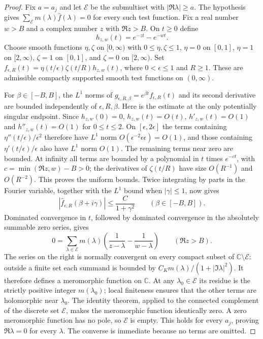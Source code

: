 \documentclass[11pt,a4paper]{article}
\theoremstyle{definition}\newtheorem{definition}[theorem]{Definition}
\theoremstyle{remark}\newtheorem{remark}[theorem]{Remark}
\begin{document}
\begin{proof}
Fix $a=a_j$ and let $\mathcal E$ be the submultiset with
$|\Re\lambda|\geq a$.  The hypothesis gives
$\sum_{\mathcal E}m(\lambda)\widehat f(\lambda)=0$ for every such test
function.  Fix a real number $w>B$ and a complex number $z$ with
$\Re z>B$.  On $t\geq0$ define
\[
 h_{z,w}(t)=e^{-zt}-e^{-wt}.
\]
Choose smooth functions $\eta,\zeta$ on $[0,\infty)$ with $0\leq\eta,\zeta
\leq1$, $\eta=0$ on $[0,1]$, $\eta=1$ on $[2,\infty)$, $\zeta=1$ on
$[0,1]$, and $\zeta=0$ on $[2,\infty)$.  Set
$f_{\epsilon,R}(t)=\eta(t/\epsilon)\zeta(t/R)h_{z,w}(t)$, where
$0<\epsilon\leq1$ and $R\geq1$.  These are admissible compactly supported
smooth test functions on $(0,\infty)$.

For $\beta\in[-B,B]$, the $L^1$ norms of
$g_{\epsilon,R,\beta}=e^{\beta t}f_{\epsilon,R}(t)$ and its second
derivative are bounded independently of $\epsilon,R,\beta$.  Here is the
estimate at the only potentially singular endpoint.  Since $h_{z,w}(0)=0$,
$h_{z,w}(t)=O(t)$, $h'_{z,w}(t)=O(1)$ and $h''_{z,w}(t)=O(1)$ for
$0\leq t\leq2$.  On $[\epsilon,2\epsilon]$ the terms containing
$\eta''(t/\epsilon)/\epsilon^2$ therefore have $L^1$ norm
$O(\epsilon^{-2}\epsilon\epsilon)=O(1)$, and those containing
$\eta'(t/\epsilon)/\epsilon$ also have $L^1$ norm $O(1)$.
The remaining terms near zero are bounded.  At infinity all terms are
bounded by a polynomial in $t$ times $e^{-ct}$, with
$c=\min(\Re z,w)-B>0$; the derivatives of $\zeta(t/R)$ have size
$O(R^{-1})$ and $O(R^{-2})$.  This proves the uniform bounds.
Twice integrating by parts in the Fourier variable, together with the
$L^1$ bound when $|\gamma|\leq1$, now gives
\[
 |\widehat f_{\epsilon,R}(\beta+i\gamma)|
 \leq\frac{C}{1+\gamma^2}
 \qquad(\beta\in[-B,B]).
\]
Dominated convergence in $t$, followed by dominated convergence in the
absolutely summable zero series, gives
\[
 0=\sum_{\lambda\in\mathcal E}m(\lambda)
       \left(\frac1{z-\lambda}-\frac1{w-\lambda}\right)
       \qquad(\Re z>B).
\]
The series on the right is normally convergent on every compact subset of
$\mathbb C\setminus\mathcal E$: outside a finite set each summand is bounded
by $C_Km(\lambda)/(1+|\Im\lambda|^2)$.  It therefore defines a
meromorphic function on $\mathbb C$.  At any $\lambda_0\in\mathcal E$
its residue is the strictly positive integer $m(\lambda_0)$; local finiteness
ensures that the other terms are holomorphic near $\lambda_0$.
The identity theorem, applied to the connected complement of the discrete
set $\mathcal E$, makes the meromorphic function identically zero.  A zero
meromorphic function has no pole, so $\mathcal E$ is empty.  This holds for
every $a_j$, proving $\Re\lambda=0$ for every $\lambda$.  The converse
is immediate because no terms are omitted.
\end{proof}
\end{document}
